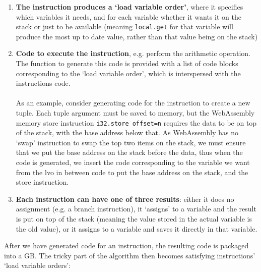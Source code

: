 \documentclass[12pt,twoside,notitlepage]{report}
\newcommand{\wainline}{\texttt}
\begin{document}
\begin{enumerate}
	\item \textbf{The instruction produces a `load variable order'}, where it specifies which variables it needs, and for each variable whether it wants it on the stack or just to be available (meaning \wainline{local.get} for that variable will produce the most up to date value, rather than that value being on the stack)
	
	\item \textbf{Code to execute the instruction}, e.g. perform the arithmetic operation. The function to generate this code is provided with a list of code blocks corresponding to the `load variable order', which is interspersed with the instructions code.
	\\\\
	As an example, consider generating code for the instruction to create a new tuple. Each tuple argument must be saved to memory, but the WebAssembly memory store instruction \wainline{i32.store offset=n} requires the data to be on top of the stack, with the base address below that. As WebAssembly has no `swap' instruction to swap the top two items on the stack, we must ensure that we put the base address on the stack before the data, thus when the code is generated, we insert the code corresponding to the variable we want from the lvo in between code to put the base address on the stack, and the store instruction.
	
	\item \textbf{Each instruction can have one of three results}: either it does no assignment (e.g. a branch instruction), it `assigns' to a variable and the result is put on top of the stack (meaning the value stored in the actual variable is the old value), or it assigns to a variable and saves it directly in that variable.
\end{enumerate}
After we have generated code for an instruction, the resulting code is packaged into a GB. The tricky part of the algorithm then becomes satisfying instructions' `load variable orders':
\end{document}
